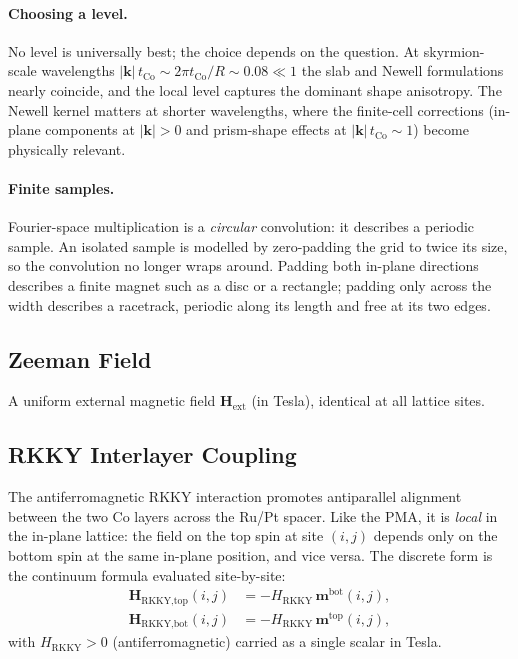 \documentclass[11pt,a4paper]{article}
\newcommand{\mb}[1]{\mathbf{#1}}
\newcommand{\Hext}{\mb{H}_{\text{ext}}}
\newcommand{\tCo}{t_{\text{Co}}}
\begin{document}
\paragraph{Choosing a level.}
No level is universally best; the choice depends on the question.
At skyrmion-scale wavelengths
$|\mb{k}|\,\tCo \sim 2\pi \tCo / R \sim 0.08 \ll 1$ the slab and
Newell formulations nearly coincide, and the local level captures
the dominant shape anisotropy.  The Newell kernel matters at shorter
wavelengths, where the finite-cell corrections (in-plane components
at $|\mb{k}| > 0$ and prism-shape effects at $|\mb{k}|\,\tCo \sim
1$) become physically relevant.

\paragraph{Finite samples.}
Fourier-space multiplication is a \emph{circular} convolution: it
describes a periodic sample.  An isolated sample is modelled by
zero-padding the grid to twice its size, so the convolution no
longer wraps around.  Padding both in-plane directions describes a
finite magnet such as a disc or a rectangle; padding only across the
width describes a racetrack, periodic along its length and free at
its two edges.

\subsection{Zeeman Field}

A uniform external magnetic field $\Hext$ (in Tesla), identical at all
lattice sites.

\subsection{RKKY Interlayer Coupling}

The antiferromagnetic RKKY interaction promotes antiparallel
alignment between the two Co layers across the Ru/Pt spacer.
Like the PMA, it is \emph{local} in the in-plane lattice: the
field on the top spin at site $(i,j)$ depends only on the
bottom spin at the same in-plane position, and vice versa.
The discrete form is the continuum formula evaluated
site-by-site:
%
\begin{align}
\mb{H}_{\text{RKKY,top}}(i,j) &=
    -H_{\text{RKKY}} \, \mb{m}^{\text{bot}}(i,j), \\
\mb{H}_{\text{RKKY,bot}}(i,j) &=
    -H_{\text{RKKY}} \, \mb{m}^{\text{top}}(i,j),
\end{align}
%
with $H_{\text{RKKY}} > 0$ (antiferromagnetic) carried as a
single scalar in Tesla.
\end{document}

